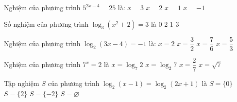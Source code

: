 \begin{ex}%
	Nghiệm của phương trình  $5^{2x-4}=25$ là:
	\choice 
		{\True $x=3$} 
		 {$x=2$}
		 {$x=1$}
		{$x=-1$} 
\end{ex}

\begin{ex}%
	Số nghiệm của phương trình ${{\log}_3}\left({x^2}+2\right)=3$ là 
	\choice 
		{$0$} 
		{\True  $2$}
		 {$1$}
		{$3$} 
\end{ex}

\begin{ex}%
	Nghiệm của  phương trình $\log_2(3x-4)=-1$ là:
	\choice 
		 {$x=2$}
		 {\True $x=\dfrac{3}{2}$}
		 {$x=\dfrac{7}{6}$}
		{$x=\dfrac{5}{3}$} 
\end{ex}

\begin{ex}%
	Nghiệm của phương trình $7^x=2$  là
	 \choice
		{\True $x=\log_7  2$}
		{$x=\log_2  7$}
		{$x=\dfrac{2}{7}$} 
		 {$x=\sqrt{7}$}
\end{ex}

\begin{ex}%
	Tập nghiệm $S$ của phương trình ${{\log}_2}\left(x-1\right)={{\log}_2}\left(2x+1\right)$ là 
	 \choice
		 {$S=\{0\}$}
		{$S=\{2\}$} 
		{$S=\{-2\}$} 
		{\True  $S=\varnothing$}
\end{ex}

